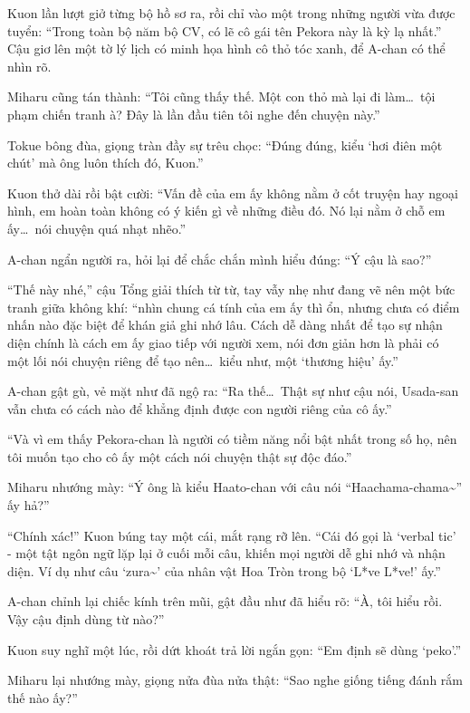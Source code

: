 \documentclass[../main.tex]{subfiles}
\begin{document}
Kuon lần lượt giở từng bộ hồ sơ ra, rồi chỉ vào một trong những người vừa được tuyển: ``Trong toàn bộ năm bộ CV, có lẽ cô gái tên Pekora này là kỳ lạ nhất.'' Cậu giơ lên một tờ lý lịch có minh họa hình cô thỏ tóc xanh, để A-chan có thể nhìn rõ.

Miharu cũng tán thành: ``Tôi cũng thấy thế. Một con thỏ mà lại đi làm\dots\ tội phạm chiến tranh à? Đây là lần đầu tiên tôi nghe đến chuyện này.''

Tokue bông đùa, giọng tràn đầy sự trêu chọc: ``Đúng đúng, kiểu `hơi điên một chút' mà ông luôn thích đó, Kuon.''

Kuon thở dài rồi bật cười: ``Vấn đề của em ấy không nằm ở cốt truyện hay ngoại hình, em hoàn toàn không có ý kiến gì về những điều đó. Nó lại nằm ở chỗ em ấy\dots\ nói chuyện quá nhạt nhẽo.''

A-chan ngẩn người ra, hỏi lại để chắc chắn mình hiểu đúng: ``Ý cậu là sao?''

``Thế này nhé,'' cậu Tổng giải thích từ từ, tay vẫy nhẹ như đang vẽ nên một bức tranh giữa không khí: ``nhìn chung cá tính của em ấy thì ổn, nhưng chưa có điểm nhấn nào đặc biệt để khán giả ghi nhớ lâu. Cách dễ dàng nhất để tạo sự nhận diện chính là cách em ấy giao tiếp với người xem, nói đơn giản hơn là phải có một lối nói chuyện riêng để tạo nên\dots\ kiểu như, một `thương hiệu' ấy.''

A-chan gật gù, vẻ mặt như đã ngộ ra: ``Ra thế\dots\ Thật sự như cậu nói, Usada-san vẫn chưa có cách nào để khẳng định được con người riêng của cô ấy.''

``Và vì em thấy Pekora-chan là người có tiềm năng nổi bật nhất trong số họ, nên tôi muốn tạo cho cô ấy một cách nói chuyện thật sự độc đáo.''

Miharu nhướng mày: ``Ý ông là kiểu Haato-chan với câu nói ``Haachama-chama\~{}'' ấy hả?''

``Chính xác!'' Kuon búng tay một cái, mắt rạng rỡ lên. ``Cái đó gọi là `verbal tic' - một tật ngôn ngữ lặp lại ở cuối mỗi câu, khiến mọi người dễ ghi nhớ và nhận diện. Ví dụ như câu `zura\~{}' của nhân vật Hoa Tròn trong bộ `L*ve L*ve!' ấy.''

A-chan chỉnh lại chiếc kính trên mũi, gật đầu như đã hiểu rõ: ``À, tôi hiểu rồi. Vậy cậu định dùng từ nào?''

Kuon suy nghĩ một lúc, rồi dứt khoát trả lời ngắn gọn: ``Em định sẽ dùng `peko'.''

Miharu lại nhướng mày, giọng nửa đùa nửa thật: ``Sao nghe giống tiếng đánh rắm thế nào ấy?''
\end{document}
